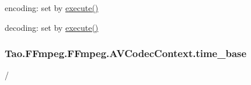 \begin{DoxyItemize}
\item encoding: set by \hyperlink{struct_tao_1_1_f_fmpeg_1_1_f_fmpeg_1_1_a_v_codec_context_a715241b68abafe3d68f967b13e514bec}{execute()}
\item decoding: set by \hyperlink{struct_tao_1_1_f_fmpeg_1_1_f_fmpeg_1_1_a_v_codec_context_a715241b68abafe3d68f967b13e514bec}{execute()} 
\end{DoxyItemize}\hypertarget{struct_tao_1_1_f_fmpeg_1_1_f_fmpeg_1_1_a_v_codec_context_afa09569e097671393d3033dd909ea1f3}{
\subsubsection[{time\_\-base}]{ {\bf Tao.FFmpeg.FFmpeg.AVCodecContext.time\_\-base}}}
\label{struct_tao_1_1_f_fmpeg_1_1_f_fmpeg_1_1_a_v_codec_context_afa09569e097671393d3033dd909ea1f3}


/ 

